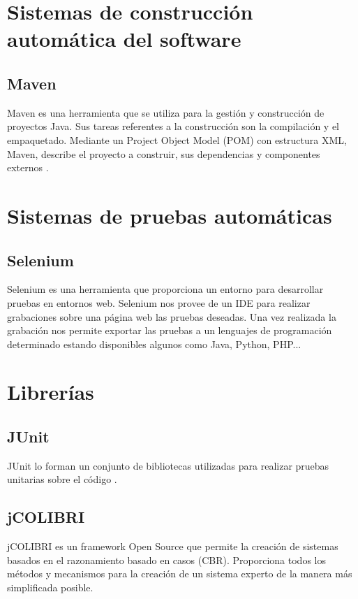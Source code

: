 \section{Sistemas de construcción automática del software}

\subsection{Maven}

Maven es una herramienta que se utiliza para la gestión y construcción de proyectos Java. Sus tareas referentes a la construcción son la compilación y el empaquetado. Mediante un Project Object Model (POM) con estructura XML, Maven, describe el proyecto a construir, sus dependencias y componentes externos \cite{maven:wiki}. 

\section{Sistemas de pruebas automáticas}

\subsection{Selenium}

Selenium es una herramienta que proporciona un entorno para desarrollar pruebas en entornos web. Selenium nos provee de un IDE para realizar grabaciones sobre una página web las pruebas deseadas. Una vez realizada la grabación nos permite exportar las pruebas a un lenguajes de programación determinado estando disponibles algunos como Java, Python, PHP... \cite{selenium:wiki}

\section{Librerías}

\subsection{JUnit}

JUnit lo forman un conjunto de bibliotecas utilizadas para realizar pruebas unitarias sobre el código \cite{junit:wiki}.

\subsection{jCOLIBRI}

jCOLIBRI es un framework Open Source que permite la creación de sistemas basados en el razonamiento basado en casos (CBR). Proporciona todos los métodos y mecanismos para la creación de un sistema experto de la manera más simplificada posible.

